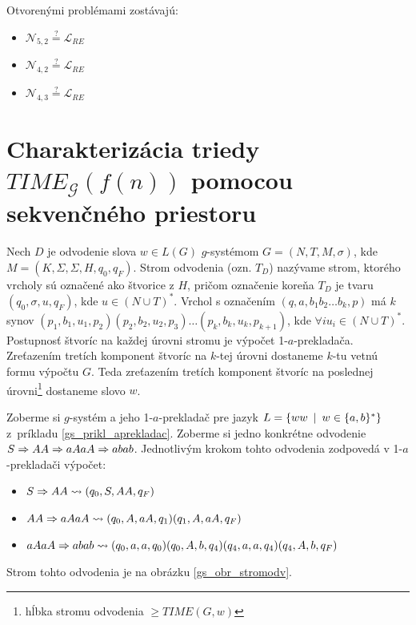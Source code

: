 Otvorenými problémami zostávajú:
\begin{itemize}
  \item $\mathcal{N}_{5,2}\overset{?}{=}\mathcal{L}_{RE}$
  \item $\mathcal{N}_{4,2}\overset{?}{=}\mathcal{L}_{RE}$
  \item $\mathcal{N}_{4,3}\overset{?}{=}\mathcal{L}_{RE}$
\end{itemize}

\section{Charakterizácia triedy $TIME_{\mathcal{G}}(f(n))$ pomocou
sek\-venč\-ného priestoru}

\begin{definicia}
  Nech $D$ je odvodenie slova $w\in L(G)$ $g$-systémom
  $G=(N,T,M,\sigma)$, kde $M=(K,\Sigma,\Sigma,H,q_0,q_F)$. Strom
  odvodenia (ozn. $T_D$) nazývame strom, ktorého vrcholy sú označené
  ako štvorice z $H$, pričom označenie koreňa $T_D$ je tvaru
  $(q_0,\sigma,u,q_F)$, kde $u\in (N\cup T)^*$. Vrchol s označením
  $(q,a,b_1b_2\dots b_k,p)$ má $k$ synov $(p_1,b_1,u_1,p_2)
  (p_2,b_2,u_2,p_3)\dots(p_k,b_k,u_k,p_{k+1})$, kde $\forall i
  u_i\in (N\cup T)^*$. Postupnosť štvoríc na každej úrovni stromu je
  výpočet 1-$a$-prekladača. Zreťazením tretích komponent štvoríc na
  $k$-tej úrovni dostaneme $k$-tu vetnú formu výpočtu $G$. Teda
  zreťazením tretích komponent štvoríc na poslednej
  úrovni\footnote{hĺbka stromu odvodenia $\geq TIME(G,w)$} dostaneme
  slovo $w$.
\end{definicia}

\begin{priklad}
  Zoberme si $g$-systém a jeho 1-$a$-prekladač pre jazyk $L=\{ww\enspace |\enspace
  w\in\{a,b\}^* \}$ \mbox{z príkladu} \ref{gs_prikl_aprekladac}. Zoberme si
  jedno konkrétne odvodenie $S\Rightarrow AA\Rightarrow aAaA\Rightarrow abab$. Jednotlivým
  krokom tohto odvodenia zodpovedá v 1-$a$-prekladači výpočet:
  \begin{itemize}
    \item $S\Rightarrow AA\rightsquigarrow (q_0,S,AA,q_F)$
    \item $AA\Rightarrow aAaA\rightsquigarrow (q_0,A,aA,q_1)(q_1,A,aA,q_F)$
    \item $aAaA\Rightarrow abab\rightsquigarrow
    (q_0,a,a,q_0)(q_0,A,b,q_4)(q_4,a,a,q_4)(q_4,A,b,q_F)$
  \end{itemize}
  Strom tohto odvodenia je na obrázku \ref{gs_obr_stromodv}.
\end{priklad}

